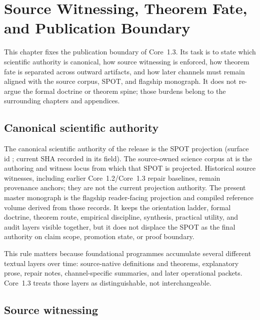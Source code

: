 \section{Source Witnessing, Theorem Fate, and Publication Boundary}
\label{sec:oc13-publication-boundary}

This chapter fixes the publication boundary of Core~1.3. Its task is to state
which scientific authority is canonical, how source witnessing is enforced, how
theorem fate is separated across outward artifacts, and how later channels must
remain aligned with the source corpus, SPOT, and flagship monograph. It does not re-argue the formal doctrine or
theorem spine; those burdens belong to the surrounding chapters and appendices.

\subsection{Canonical scientific authority}

The canonical scientific authority of the release is the SPOT projection
(surface id ; current SHA recorded in its
 field). The source-owned science corpus at
 is the
authoring and witness locus from which that SPOT is projected. Historical
source witnesses, including earlier Core~1.2/Core~1.3 repair baselines, remain
provenance anchors; they are not the current projection authority. The present
master monograph is the flagship reader-facing projection and compiled
reference volume derived from those records. It keeps the orientation ladder,
formal doctrine, theorem route, empirical discipline, synthesis, practical
utility, and audit layers visible together, but it does not displace the SPOT
as the final authority on claim scope, promotion state, or proof boundary.

This rule matters because foundational programmes accumulate several different
textual layers over time: source-native definitions and theorems, explanatory
prose, repair notes, channel-specific summaries, and later operational packets.
Core~1.3 treats those layers as distinguishable, not interchangeable.

\subsection{Source witnessing}

